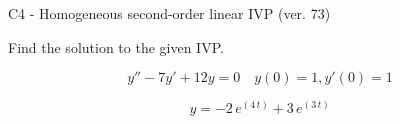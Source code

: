 \begin{exercise}
  \begin{exerciseTitle}C4 - Homogeneous second-order linear IVP (ver. 73)\end{exerciseTitle}
  \begin{exerciseStatement}
    
Find the solution to the given IVP.

    
\[y''-7y'+12y = 0 \hspace{1em} y(0) = 1 , y'(0) = 1\]

  \end{exerciseStatement}
  \begin{exerciseAnswer}
    
\[y= -2 \, e^{\left(4 \, t\right)} + 3 \, e^{\left(3 \, t\right)}\]

  \end{exerciseAnswer}
\end{exercise}